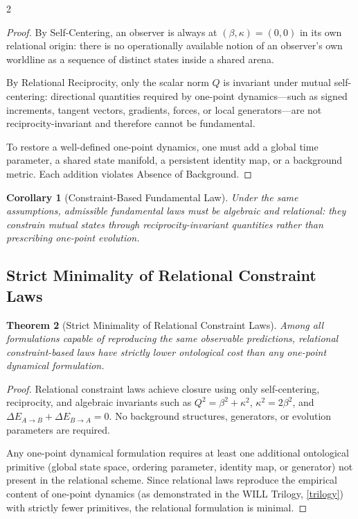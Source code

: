 \documentclass[10pt, a4paper]{article}
\newtheorem{theorem}{Theorem}[section]
\newtheorem{corollary}[theorem]{Corollary}
\begin{document}
\begin{multicols}{2}
\begin{proof}
By Self-Centering, an observer is always at $(\beta,\kappa)=(0,0)$ in its own relational origin: there is no operationally available notion of an observer's own worldline as a sequence of distinct states inside a shared arena.

By Relational Reciprocity, only the scalar norm $Q$ is invariant under mutual self-centering: directional quantities required by one-point dynamics---such as signed increments, tangent vectors, gradients, forces, or local generators---are not reciprocity-invariant and therefore cannot be fundamental.

To restore a well-defined one-point dynamics, one must add a global time parameter, a shared state manifold, a persistent identity map, or a background metric. Each addition violates Absence of Background.
\end{proof}

\begin{corollary}[Constraint-Based Fundamental Law]
Under the same assumptions, admissible fundamental laws must be algebraic and relational: they constrain mutual states through reciprocity-invariant quantities rather than prescribing one-point evolution.
\end{corollary}


\subsection{Strict Minimality of Relational Constraint Laws}
\hypertarget{thm:minimality}{}\label{thm:minimality}

\begin{theorem}[Strict Minimality of Relational Constraint Laws]
Among all formulations capable of reproducing the same observable predictions, relational constraint-based laws have strictly lower ontological cost than any one-point dynamical formulation.
\end{theorem}

\begin{proof}
Relational constraint laws achieve closure using only self-centering, reciprocity, and algebraic invariants such as
\href{https://willrg.com/documents/WILL_RG_I.pdf#sec:DisQ}{$Q^2=\beta^2+\kappa^2$},
\href{https://willrg.com/documents/WILL_RG_I.pdf#thm:Closure}{$\kappa^2=2\beta^2$}, and
\href{https://willrg.com/documents/WILL_RG_I.pdf#}{$\Delta E_{A \to B} + \Delta E_{B \to A} = 0$}.
No background structures, generators, or evolution parameters are required.

Any one-point dynamical formulation requires at least one additional ontological primitive (global state space, ordering parameter, identity map, or generator) not present in the relational scheme. Since relational laws reproduce the empirical content of one-point dynamics (as demonstrated in the WILL Trilogy, \ref{trilogy}) with strictly fewer primitives, the relational formulation is minimal.
\end{proof}


\end{multicols}
\end{document}
